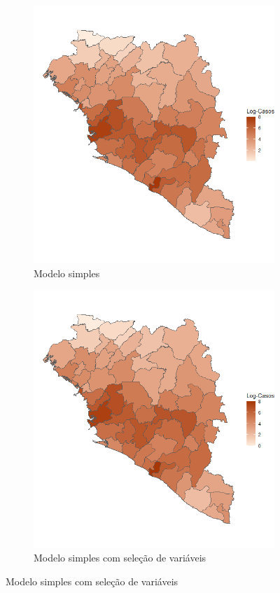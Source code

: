 \begin{figure} %
\begin{subfigure}{0.38\textwidth}
\includegraphics[width=\linewidth]{images/posterior_mean_simples.png}
\caption{Modelo simples} \label{fig:a}
\end{subfigure}\hspace*{\fill}
\begin{subfigure}{0.38\textwidth}
\includegraphics[width=\linewidth]{images/posterior_mean_ssvs.png}
\caption{Modelo simples com seleção de variáveis} \label{fig:b}
\end{subfigure}


\end{figure}
